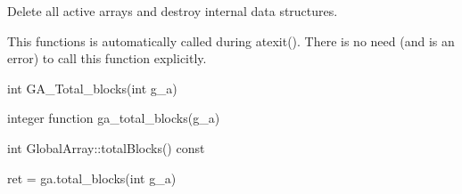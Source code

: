 \documentclass[12pt]{article}
\begin{document}
\wcoll

\begin{desc}

Delete all active arrays and destroy internal data structures.

\end{desc}

\begin{pydesc}

This functions is automatically called during atexit(). There is no need (and
is an error) to call this function explicitly.

\end{pydesc}


\begin{capi}
\begin{ccode}
int GA_Total_blocks(int g_a)
\end{ccode}
\begin{funcargs}
\end{funcargs}
\end{capi}

\begin{fapi}
\begin{fcode}
integer function ga_total_blocks(g_a)
\end{fcode}
\begin{funcargs}
\end{funcargs}
\end{fapi}

\begin{cxxapi}
\begin{cxxcode}
int GlobalArray::totalBlocks() const
\end{cxxcode}
\begin{funcargs}
\end{funcargs}
\end{cxxapi}

\begin{pyapi}
\begin{pycode}
ret = ga.total_blocks(int g_a)
\end{pycode}
\begin{funcargs}
\end{funcargs}
\end{pyapi}
\end{document}
